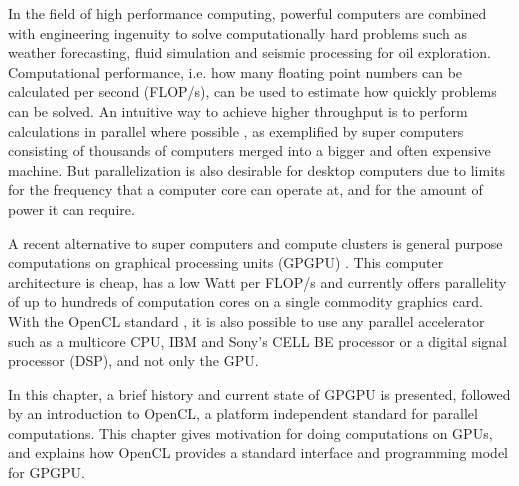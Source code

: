 In the field of high performance computing, powerful computers are combined with engineering ingenuity to solve computationally hard problems such as weather forecasting, fluid simulation and seismic processing for oil exploration. Computational performance, i.e. how many floating point numbers can be calculated per second (FLOP/s), can be used to estimate how quickly problems can be solved. An intuitive way to achieve higher throughput is to perform calculations in parallel where possible \cite{wilkinson2005}, as exemplified by super computers consisting of thousands of computers merged into a bigger and often expensive machine. But parallelization is also desirable for desktop computers due to limits for the frequency that a computer core can operate at, and for the amount of power it can require.

A recent alternative to super computers and compute clusters is general purpose computations on graphical processing units (GPGPU) \cite{owens2008, stantchev2009}. This computer architecture is cheap, has a low Watt per FLOP/s and currently offers parallelity of up to hundreds of computation cores on a single commodity graphics card. With the OpenCL standard \cite{openclspec}, it is also possible to use any parallel accelerator such as a multicore CPU, IBM and Sony's CELL BE processor or a digital signal processor (DSP), and not only the GPU.

In this chapter, a brief history and current state of GPGPU is presented, followed by an introduction to OpenCL, a platform independent standard for parallel computations. This chapter gives motivation for doing computations on GPUs, and explains how OpenCL provides a standard interface and programming model for GPGPU. 
